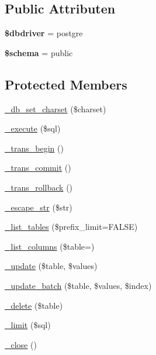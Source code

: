 \subsection*{Public Attributen}
\begin{DoxyCompactItemize}
\item 
\mbox{\label{class_c_i___d_b__postgre__driver_a0cde2a16322a023d040aa7f725877597}} 
{\bfseries \$dbdriver} = \textquotesingle{}postgre\textquotesingle{}
\item 
\mbox{\label{class_c_i___d_b__postgre__driver_a83022b1d70799d2bde3d64dca9cb40ee}} 
{\bfseries \$schema} = \textquotesingle{}public\textquotesingle{}
\end{DoxyCompactItemize}
\subsection*{Protected Members}
\begin{DoxyCompactItemize}
\item 
\mbox{\hyperlink{class_c_i___d_b__postgre__driver_a2b808d420d8e9fea0b73ad7127f5efb8}{\+\_\+db\+\_\+set\+\_\+charset}} (\$charset)
\item 
\mbox{\hyperlink{class_c_i___d_b__postgre__driver_a114ab675d89bf8324a41785fb475e86d}{\+\_\+execute}} (\$sql)
\item 
\mbox{\hyperlink{class_c_i___d_b__postgre__driver_ac81ac882c1d54347d810199a15856aac}{\+\_\+trans\+\_\+begin}} ()
\item 
\mbox{\hyperlink{class_c_i___d_b__postgre__driver_a6fe7f373e0b11cfae23a5f41c0b35dda}{\+\_\+trans\+\_\+commit}} ()
\item 
\mbox{\hyperlink{class_c_i___d_b__postgre__driver_ad49a116b0776c26b53114c9093fd102a}{\+\_\+trans\+\_\+rollback}} ()
\item 
\mbox{\hyperlink{class_c_i___d_b__postgre__driver_af8ef0237bfcdb19215b63fff769e7a55}{\+\_\+escape\+\_\+str}} (\$str)
\item 
\mbox{\hyperlink{class_c_i___d_b__postgre__driver_a435c0f3ce54fe7daa178baa8532ebd54}{\+\_\+list\+\_\+tables}} (\$prefix\+\_\+limit=F\+A\+L\+SE)
\item 
\mbox{\hyperlink{class_c_i___d_b__postgre__driver_a7ccb7f9c301fe7f0a9db701254142b63}{\+\_\+list\+\_\+columns}} (\$table=\textquotesingle{}\textquotesingle{})
\item 
\mbox{\hyperlink{class_c_i___d_b__postgre__driver_a2540b03a93fa73ae74c10d0e16fc073e}{\+\_\+update}} (\$table, \$values)
\item 
\mbox{\hyperlink{class_c_i___d_b__postgre__driver_a336b9ebb119e47b6a84bb7fc9d4dae93}{\+\_\+update\+\_\+batch}} (\$table, \$values, \$index)
\item 
\mbox{\hyperlink{class_c_i___d_b__postgre__driver_a133ea8446ded52589bd22cc9163d0896}{\+\_\+delete}} (\$table)
\item 
\mbox{\hyperlink{class_c_i___d_b__postgre__driver_a3a02ea06541b8ecc25a33a61651562c8}{\+\_\+limit}} (\$sql)
\item 
\mbox{\hyperlink{class_c_i___d_b__postgre__driver_a4d9082658000e5ede8312067c6dda9db}{\+\_\+close}} ()
\end{DoxyCompactItemize}
